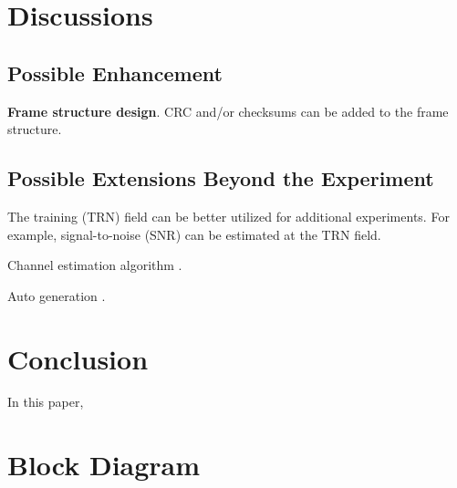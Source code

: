 \documentclass[journal,twoside]{IEEEtran}
\begin{document}
  \section{Discussions}

    \subsection{Possible Enhancement}

      \textbf{Frame structure design}.
      CRC and/or checksums can be added to the frame structure.

    \subsection{Possible Extensions Beyond the Experiment}

      The training (TRN) field can be better utilized for additional experiments.
      For example, signal-to-noise (SNR) can be estimated at the TRN field.

      Channel estimation algorithm \cite{zhao2023ompl,you2023beam}.

      Auto generation \cite{zhao2023automatic}.

  \section{Conclusion}

    In this paper,


  \appendices

  \section{Block Diagram}

  
  
\end{document}
